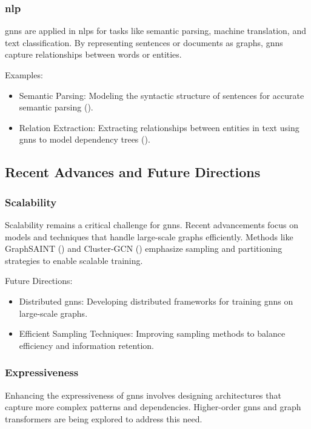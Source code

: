 \subsubsection*{\acrlong{nlp}}

\glspl{gnn} are applied in \glspl{nlp} for tasks like semantic parsing, machine translation, and text classification. By representing sentences or documents as graphs, \glspl{gnn} capture relationships between words or entities.

Examples:
\begin{itemize}
    \item Semantic Parsing: Modeling the syntactic structure of sentences for accurate semantic parsing (\cite{Zeng2019}).
    \item Relation Extraction: Extracting relationships between entities in text using \glspl{gnn} to model dependency trees (\cite{Sahu2019}).
\end{itemize}

\subsection*{Recent Advances and Future Directions}

\subsubsection*{Scalability}

Scalability remains a critical challenge for \glspl{gnn}. Recent advancements focus on models and techniques that handle large-scale graphs efficiently. Methods like GraphSAINT (\cite{Zeng2019}) and Cluster-GCN (\cite{Chiang2019}) emphasize sampling and partitioning strategies to enable scalable training.

Future Directions:
\begin{itemize}
    \item Distributed \glspl{gnn}: Developing distributed frameworks for training \glspl{gnn} on large-scale graphs.
    \item Efficient Sampling Techniques: Improving sampling methods to balance efficiency and information retention.
\end{itemize}


\subsubsection*{Expressiveness}

Enhancing the expressiveness of \glspl{gnn} involves designing architectures that capture more complex patterns and dependencies. Higher-order \glspl{gnn} and graph transformers are being explored to address this need.

